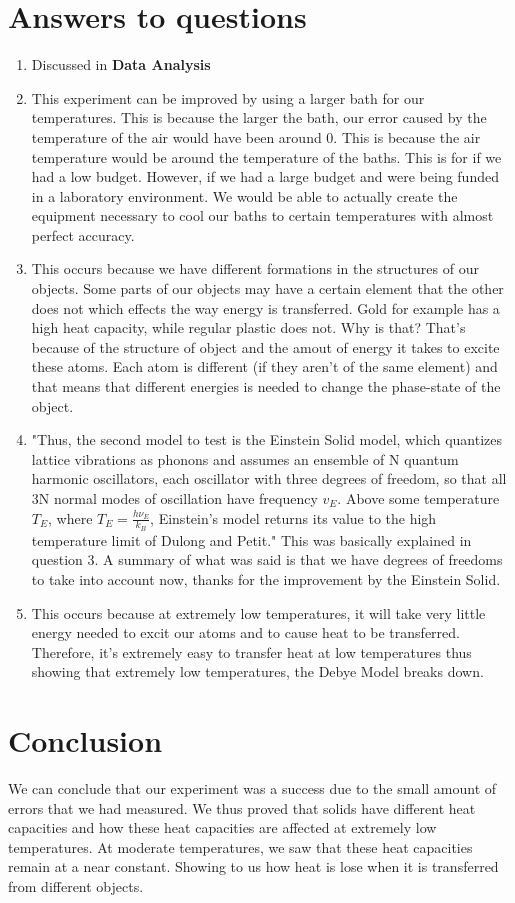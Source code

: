 \documentclass[12pt]{report}
\begin{document}
\section{Answers to questions}
	\begin{enumerate}
		\item Discussed in \textbf{Data Analysis}
		\item This experiment can be improved by using a larger bath for our temperatures. This is because the larger 				the bath, our error caused by the temperature of the air would have been around 0. This is because the 			air temperature would be around the temperature of the baths.  This is for if we had a low budget. 					However, if we had a large budget and were being funded in a laboratory environment. We would be 				able to actually create the equipment necessary to cool our baths to certain temperatures with almost 				perfect accuracy.  
		\item This occurs because we have different formations in the structures of our objects. Some parts of our 				objects may have a certain element that the other does not which effects the way energy is 						transferred. Gold for example has a high heat capacity, while regular plastic does not. Why is that?					That's because of the structure of object and the amout of energy it takes to excite these atoms. Each 				atom is different (if they aren't of the same element) and that means that different energies is needed           to change the phase-state of the object.
		\item "Thus, the second model to test is the Einstein Solid model, which quantizes lattice vibrations as phonons and assumes an ensemble of N quantum harmonic oscillators, each oscillator with three degrees of freedom, so
that all 3N normal modes of oscillation have frequency $v_E$. Above some temperature $T_E$, where
$T_E = \frac{hν_Ε}{k_B}$, Einstein’s model returns its value to the high temperature limit of Dulong and Petit."
This was basically explained in question 3. A summary of what was said is that we have degrees of freedoms to take into account now, thanks for the improvement by the Einstein Solid. 
		\item This occurs because at extremely low temperatures, it will take very little energy needed to excit our atoms and to cause heat to be transferred. Therefore, it's extremely easy to transfer heat at low temperatures thus showing that extremely low temperatures, the Debye Model breaks down. 
	\end{enumerate}
\section{Conclusion}
	We can conclude that our experiment was a success due to the small amount of errors that we had measured. We thus proved that solids have different heat capacities and how these heat capacities are affected at extremely low temperatures. At moderate temperatures, we saw that these heat capacities remain at a near constant. Showing to us how heat  is lose when it is transferred from different objects.
\end{document}
